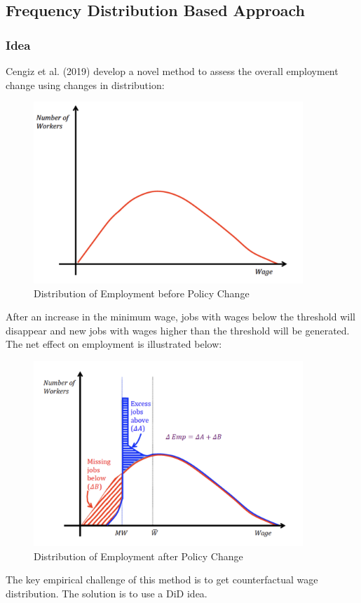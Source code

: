    \subsection{Frequency Distribution Based Approach}
        \subsubsection{Idea}
        Cengiz et al. (2019) develop a novel method to assess the overall employment change using changes in distribution:
        \begin{figure}[H]
            \centering
            \includegraphics[width=4in]{images/ch2/Freq_approach_1.png}
            \caption{Distribution of Employment before Policy Change}
        \end{figure}
        After an increase in the minimum wage, jobs with wages below the threshold will disappear and new jobs with wages higher than the threshold will be generated. The net effect on employment is illustrated below:
        \begin{figure}[H]
            \centering
            \includegraphics[width=4in]{images/ch2/Freq_approach_2.png}
            \caption{Distribution of Employment after Policy Change}
            \label{fig:freq_approach}
        \end{figure}
        The key empirical challenge of this method is to get counterfactual wage distribution. The solution is to use a DiD idea.
        

